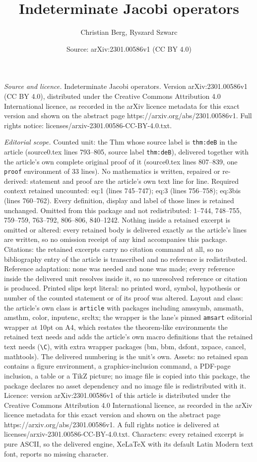\documentclass[10pt,a4paper]{amsart}
\title[Indeterminate Jacobi operators]{Indeterminate Jacobi operators}
\author{Christian Berg, Ryszard Szwarc}
\date{Source: arXiv:2301.00586v1 (CC BY 4.0)}
\begin{document}
\maketitle

\noindent\emph{Source and licence.} Indeterminate Jacobi operators. Version arXiv:2301.00586v1 (CC BY 4.0), distributed under the Creative Commons Attribution 4.0 International licence, as recorded in the arXiv licence metadata for this exact version and shown on the abstract page https://arxiv.org/abs/2301.00586v1. Full rights notice: licenses/arxiv-2301.00586-CC-BY-4.0.txt.\par\smallskip

\noindent\textit{Editorial scope.} Counted unit: the Thm whose source label is \texttt{thm:deB} in the article (source0.tex lines 793--805, source label \texttt{thm:deB}), delivered together with the article's own complete original proof of it (source0.tex lines 807--839, one \texttt{proof} environment of 33 lines). No mathematics is written, repaired or re-derived: statement and proof are the article's own text line for line. Required context retained uncounted: eq:1 (lines 745--747); eq:3 (lines 756--758); eq:3bis (lines 760--762). Every definition, display and label of those lines is retained unchanged. Omitted from this package and not redistributed: 1--744, 748--755, 759--759, 763--792, 806--806, 840--1242. Nothing inside a retained excerpt is omitted or altered: every retained body is delivered exactly as the article's lines are written, so no omission receipt of any kind accompanies this package. Citations: the retained excerpts carry no citation command at all, so no bibliography entry of the article is transcribed and no reference is redistributed. Reference adaptation: none was needed and none was made; every reference inside the delivered unit resolves inside it, so no unresolved reference or citation is produced. Printed slips kept literal: no printed word, symbol, hypothesis or number of the counted statement or of its proof was altered. Layout and class: the article's own class is \texttt{article} with packages including amssymb, amsmath, amsthm, color, inputenc, srcltx; the wrapper is the lane's pinned \texttt{amsart} editorial wrapper at 10pt on A4, which restates the theorem-like environments the retained text needs and adds the article's own macro definitions that the retained text needs (\texttt{\textbackslash C}), with extra wrapper packages (bm, bbm, dsfont, xspace, cancel, mathtools). The delivered numbering is the unit's own. Assets: no retained span contains a figure environment, a graphics-inclusion command, a PDF-page inclusion, a table or a TikZ picture; no image file is copied into this package, the package declares no asset dependency and no image file is redistributed with it. Licence: version arXiv:2301.00586v1 of this article is distributed under the Creative Commons Attribution 4.0 International licence, as recorded in the arXiv licence metadata for this exact version and shown on the abstract page https://arxiv.org/abs/2301.00586v1. A full rights notice is delivered at licenses/arxiv-2301.00586-CC-BY-4.0.txt. Characters: every retained excerpt is pure ASCII, so the delivered engine, XeLaTeX with its default Latin Modern text font, reports no missing character.
\end{document}
